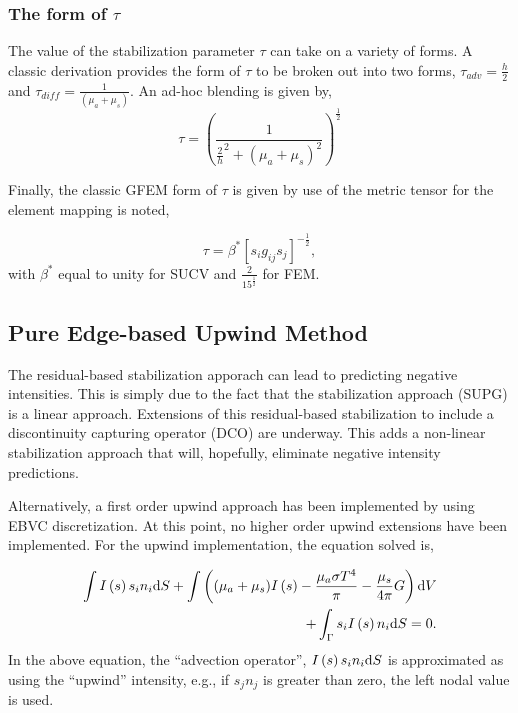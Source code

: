 \subsubsection{The form of $\tau$}
The value of the stabilization parameter $\tau$ can take on a variety of forms. 
A classic derivation provides the form of $\tau$ to be broken out into two forms, 
$\tau_{adv} = \frac{h}{2}$ and $\tau_{diff} = \frac{1}{(\mu_a+\mu_s)}$. An ad-hoc blending 
is given by,
\begin{equation}
   \tau  = \left( \frac{1} {\frac{2}{h}^2 + (\mu_a+\mu_s)^2} \right)^ \frac{1}{2}
\label{blendedTau}
\end{equation}

Finally, the classic GFEM form of $\tau$ is given by use of the metric tensor for the element mapping is noted,

\begin{equation}
   \tau = \beta^* [s_i g_{ij}s_j]^{-\frac{1}{2}},
\label{farzin}
\end{equation}
with $\beta^*$ equal to unity for SUCV and $\frac{2}{15^{\frac{1}{2}}}$ for FEM.

\subsection{Pure Edge-based Upwind Method}
The residual-based stabilization apporach can lead to predicting negative intensities. This is simply due 
to the fact that the stabilization approach (SUPG) is a linear approach. Extensions of this residual-based
stabilization to include a discontinuity capturing operator (DCO) are underway. This adds a non-linear stabilization
approach that will, hopefully, eliminate negative intensity predictions. 

Alternatively, a first order upwind approach has been implemented by using EBVC discretization. At this point, 
no higher order upwind extensions have been implemented. For the upwind implementation, the equation solved is,

\begin{eqnarray}
   \int I\left(s\right) s_i n_i {\rm d}S + \int \left( (\mu_a + \mu_s ) I\left(s\right) 
   - {{\mu_a \sigma T^4} \over {\pi}} -\frac{\mu_s}{4\pi}G \right) {\rm d}V  \nonumber \\
+ \int_\Gamma s_i I\left(s\right) n_i {\rm d}S  = 0.
\label{rteSUCVForm}
\end{eqnarray}
In the above equation, the ``advection operator'', $I\left(s\right) s_i n_i {\rm d}S$ is
approximated as using the ``upwind'' intensity, e.g., if $s_j n_j$ is greater than zero, 
the left nodal value is used.

